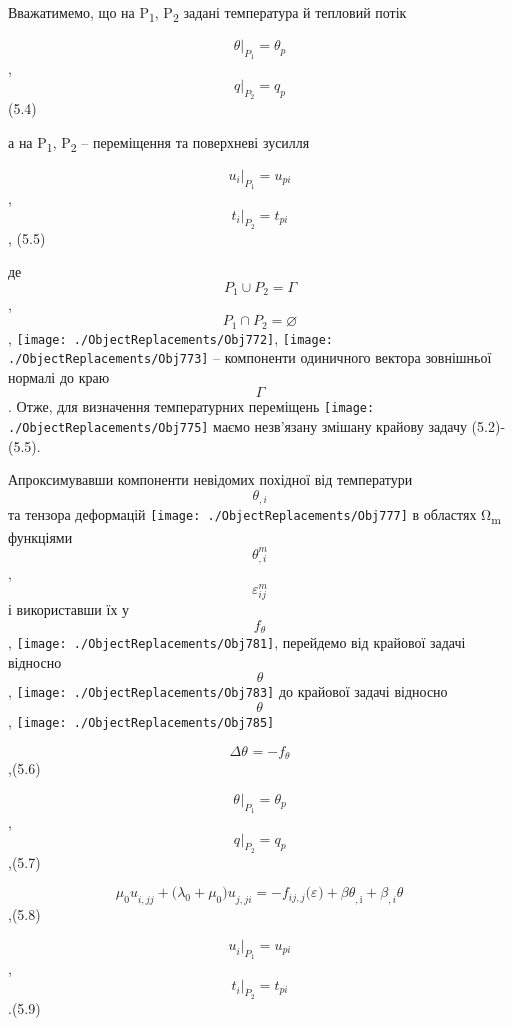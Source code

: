 Вважатимемо, що на P\textsubscript{1}, P\textsubscript{2 } задані
температура й тепловий потік

\[{\theta{|_{P_{1}} = \theta_{p}}}{}\],
\[{q{|_{P_{2}} = q_{p}}}{}\](5.4)

а на P\textsubscript{1}, P\textsubscript{2 } -- переміщення та
поверхневі зусилля

\[{u_{i}{|_{P_{1}} = u_{\mathit{\text{pi}}}}}{}\],
\[{t_{i}{|_{P_{2}} = t_{\mathit{\text{pi}}}}}{}\], (5.5)

де \[{{P_{1} \cup P_{2}} = \Gamma}{}\],
\[{{P_{1} \cap P_{2}} = \varnothing}{}\],
\texttt{[image: ./ObjectReplacements/Obj772]},
\texttt{[image: ./ObjectReplacements/Obj773]}
-- компоненти одиничного вектора зовнішньої нормалі до краю
\[\Gamma{}\]. Отже, для визначення температурних переміщень
\texttt{[image: ./ObjectReplacements/Obj775]}
маємо незв'язану змішану крайову задачу (5.2)-(5.5).

Апроксимувавши компоненти невідомих похідної від температури
\[\theta_{,i}{}\] та тензора деформацій
\texttt{[image: ./ObjectReplacements/Obj777]}
в областях Ω\textsubscript{m} функціями \[\theta_{,i}^{m}{}\],
\[\varepsilon_{\mathit{\text{ij}}}^{m}{}\] і використавши їх у
\[f_{\theta}{}\],
\texttt{[image: ./ObjectReplacements/Obj781]},
перейдемо від крайової задачі відносно \[\theta{}\],
\texttt{[image: ./ObjectReplacements/Obj783]}
до крайової задачі відносно \[\theta^{}{}\],
\texttt{[image: ./ObjectReplacements/Obj785]}

\[{\mathit{\Delta\theta}^{} = {- f_{\theta}}}{}\],(5.6)

\[{\theta^{}{|_{P_{1}} = \theta_{p}}}{}\],\emph{}\[{q^{}{|_{P_{2}} = q_{p}}}{}\],(5.7)

\[{\mu_{0}{u_{i,\mathit{\text{jj}}}^{} + (}{\lambda_{0} + \mu_{0}}){u_{j,\mathit{\text{ji}}}^{} = {- f_{\mathit{\text{ij}},j}}}(\varepsilon^{}{) + \mathit{\text{βθ}_{\mathrm{,i}}^{\mathrm{}}} + \beta_{,i}}\theta^{}}{}\],(5.8)

\[{u_{i}^{}{|_{P_{1}} = u_{\mathit{\text{pi}}}}}{}\],
\[{t_{i}^{}{|_{P_{2}} = t_{\mathit{\text{pi}}}}}{}\].(5.9)

